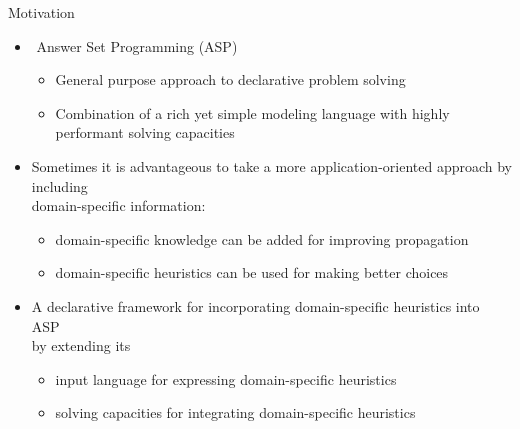 \begin{block}{Motivation}
  \begin{itemize}
    \bigskip %

	\item $ \! $ \alert{Answer Set Programming} (ASP)
	\begin{itemize}
		\item General purpose approach to \alert{declarative problem solving}
		\item Combination of a rich yet simple \alert{modeling language} with highly performant \alert{solving capacities}
	\end{itemize}

    \bigskip %
%
	\item 
	    Sometimes it is advantageous to take a more application-oriented approach by including \\
	    domain-specific information:
	\begin{itemize}
	    \item \alert{domain-specific knowledge} can be added for improving propagation
	    \item \alert{domain-specific heuristics}  can be used for making better choices
	\end{itemize}
%
    \bigskip %

	\item {} A declarative framework for \alert{incorporating domain-specific heuristics into ASP} \\ by extending its
	\begin{itemize}
	    \item input language for expressing domain-specific heuristics
	    \item solving capacities for integrating domain-specific heuristics
	\end{itemize}
  \end{itemize}
\end{block}

\bigskip \bigskip \bigskip
\bigskip %

